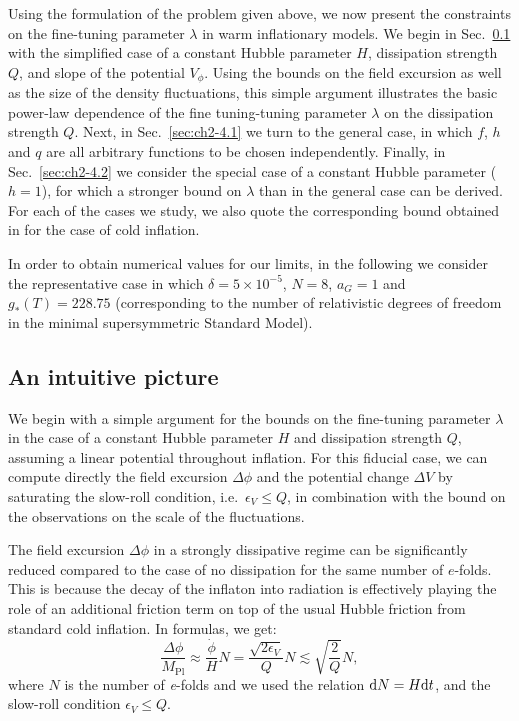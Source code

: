 Using the formulation of the problem given above,
we now present the constraints on the fine-tuning parameter $\lambda$ in warm inflationary models. We begin in Sec.~\ref{sec:ch2-4.0} with the simplified case of a constant Hubble parameter $H$, dissipation strength $Q$, and slope of the potential $V_\phi$. Using the bounds on the field excursion as well as the size of the density fluctuations, this simple argument illustrates the basic power-law dependence of the fine tuning-tuning parameter $\lambda$ on the dissipation strength $Q$. Next, in Sec.~\ref{sec:ch2-4.1} we turn to the general case, in which $f$, $h$ and $q$ are all arbitrary functions to be chosen independently. Finally, in Sec.~\ref{sec:ch2-4.2} we consider the special case of a constant Hubble parameter ($h =1$), for which a stronger bound on $\lambda$ than in the general case can be derived. For each of the cases we study, we also quote the corresponding bound obtained in \citep{Adams:1990pn} for the case of cold inflation.

In order to obtain numerical values for our limits, in the following we consider the representative case in which $\delta = 5\times 10^{-5}$, $N=8$, $a_G=1$ and $g_{*}(T)=228.75$ (corresponding to the number of relativistic degrees of freedom in the minimal supersymmetric Standard Model).

\subsection{An intuitive picture}
\label{sec:ch2-4.0}

We begin with a simple argument for the bounds on the fine-tuning parameter $\lambda$ in the case of a constant Hubble parameter $H$ and dissipation strength $Q$, assuming a linear potential throughout inflation. For this fiducial case, we can compute directly the field excursion $\Delta\phi$ and the potential change $\Delta V$ by saturating the slow-roll condition, i.e.\ $\epsilon_V\leq Q$, in combination with the bound on the observations on the scale of the fluctuations.

 The field excursion $\Delta\phi$ in a strongly dissipative regime can be significantly reduced compared to the case of no dissipation for the same number of $e$-folds. This is because the decay of the inflaton into radiation is effectively playing the role of an additional friction term on top of the usual Hubble friction from standard cold inflation. In formulas, we get:
\begin{equation}
    \frac{\Delta \phi}{M_{\mathrm{Pl}}}\approx\frac{\dot{\phi}}{H} N= \frac{\sqrt{2 \epsilon_V}}{Q} N\lesssim \sqrt{\frac{2}{Q}}N, \label{eq:ch2-4.0.1}
\end{equation}
where $N$ is the number of \textit{e}-folds and we used the relation ${\rm d}N=H{\rm d}t$, and  the slow-roll condition $\epsilon_V\leq Q$.

